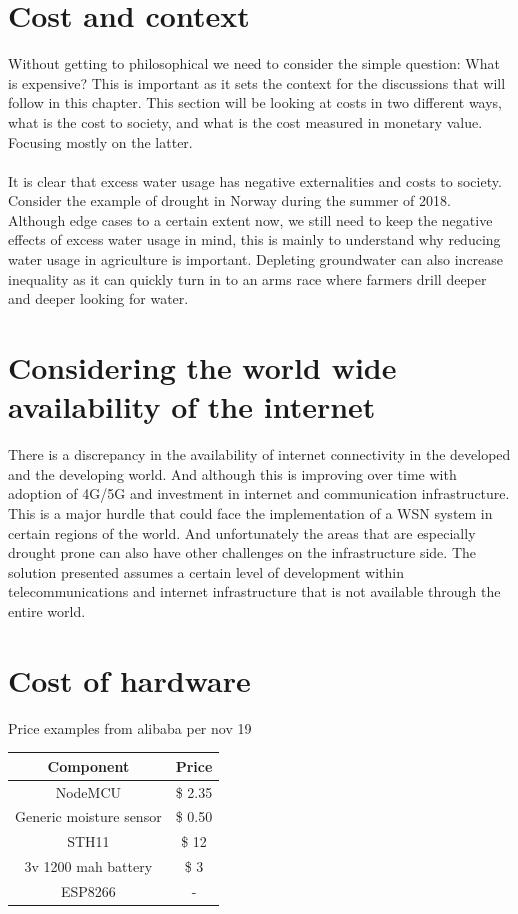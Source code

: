 \documentclass[]{uiophd}
\begin{document}
\section{Cost and context}
Without getting to philosophical we need to consider the simple question: What is expensive? This is important as it sets the context for the discussions that will follow in this chapter. This section will be looking at costs in two different ways, what is the cost to society, and what is the cost measured in monetary value. Focusing mostly on the latter. 
\\\\
It is clear that excess water usage has negative externalities and costs to society. Consider the  example of drought in Norway during the summer of 2018. Although edge cases to a certain extent now, we still need to keep the negative effects of excess water usage in mind, this is mainly to understand why reducing water usage in agriculture is important. Depleting groundwater can also increase inequality as it can quickly turn in to an arms race where farmers drill deeper and deeper looking for water.
\section{Considering the world wide availability of the internet}
There is a discrepancy in the availability of internet connectivity in the developed and the developing world. And although this is improving over time with adoption of 4G/5G and investment in internet and communication infrastructure. This is a major hurdle that could face the implementation of a WSN system in certain regions of the world. And unfortunately the areas that are especially drought prone can also have other challenges on the infrastructure side. The solution presented assumes a certain level of development within telecommunications and internet infrastructure that is not available through the entire world.
\section{Cost of hardware}

Price examples from alibaba per nov 19

\begin{center}
 \begin{tabular}{||c | c||} 
 \hline
 Component & Price \\ [0.5ex] 
 \hline\hline
 NodeMCU & \$ 2.35 \\ 
 \hline
 Generic moisture sensor & \$ 0.50 \\
 \hline
 STH11 & \$ 12 \\
 \hline
 3v 1200 mah battery & \$ 3 \\
 \hline
 ESP8266 & - \\ [1ex] 
 \hline
\end{tabular}
\end{center}
\end{document}
